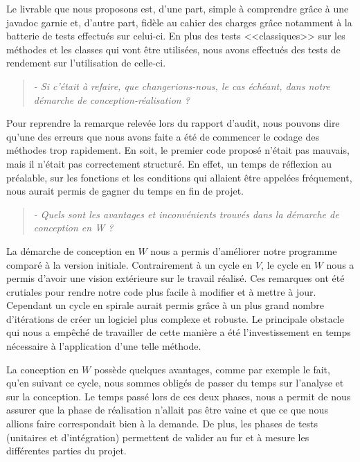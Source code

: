 \documentclass[12pt,a4paper]{report}
\begin{document}
Le livrable que nous proposons est, d'une part, simple à comprendre grâce à une javadoc garnie et, d'autre part, fidèle au cahier des charges grâce notamment à la batterie de tests effectués sur celui-ci. En plus des tests <<classiques>> sur les méthodes et les classes qui vont être utilisées, nous avons effectués des tests de rendement sur l'utilisation de celle-ci. 

\begin{quotation}
\textit{- Si c'était à refaire, que changerions-nous, le cas échéant, dans notre démarche de conception-réalisation ?}
\end{quotation}

Pour reprendre la remarque relevée lors du rapport d'audit, nous pouvons dire qu'une des erreurs que nous avons faite a été de commencer le codage des méthodes trop rapidement. En soit, le premier code proposé n'était pas mauvais, mais il n'était pas correctement structuré. En effet, un temps de réflexion au préalable, sur les fonctions et les conditions qui allaient être appelées fréquement, nous aurait permis de gagner du temps en fin de projet. 

\begin{quotation}
\textit{- Quels sont les avantages et inconvénients trouvés dans la démarche de conception en W ?}
\end{quotation}


La démarche de conception en $W$ nous a permis d'améliorer notre programme comparé à la version initiale. Contrairement à un cycle en $V$, le cycle en $W$ nous a permis d'avoir une vision extérieure sur le travail réalisé. Ces remarques ont été crutiales pour rendre notre code plus facile à modifier et à mettre à jour. Cependant un cycle en spirale aurait permis grâce à un plus grand nombre d'itérations de créer un logiciel plus complexe et robuste. Le principale obstacle qui nous a empêché de travailler de cette manière a été l'investissement en temps nécessaire à l'application d'une telle méthode. 

La conception en $W$ possède quelques avantages, comme par exemple le fait, qu'en suivant ce cycle, nous sommes obligés de passer du temps sur l'analyse et sur la conception. Le temps passé lors de ces deux phases, nous a permit de nous assurer que la phase de réalisation n'allait pas être vaine et que ce que nous allions faire correspondait bien à la demande. De plus, les phases de tests (unitaires et d'intégration) permettent de valider au fur et à mesure les différentes parties du projet.\\
\end{document}
